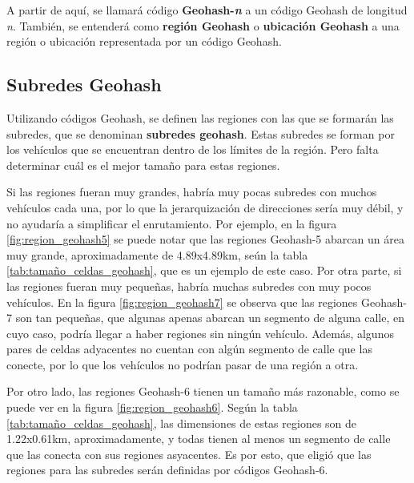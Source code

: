 A partir de aquí, se llamará código \textbf{Geohash-\textit{n}} a un código
Geohash de longitud \textit{n}. También, se entenderá como \textbf{región
Geohash} o \textbf{ubicación Geohash} a una región o ubicación representada por
un código Geohash.

\subsection{Subredes Geohash}
\label{subsec:subredes_geohash}

Utilizando códigos Geohash, se definen las regiones con las que se formarán las
subredes, que se denominan \textbf{subredes geohash}. Estas subredes se forman
por los vehículos que se encuentran dentro de los límites de la región. Pero
falta determinar cuál es el mejor tamaño para estas regiones.

Si las regiones fueran muy grandes, habría muy pocas subredes con muchos
vehículos cada una, por lo que la jerarquización de direcciones sería muy débil,
y no ayudaría a simplificar el enrutamiento. Por ejemplo, en la figura
\ref{fig:region_geohash5} se puede notar que las regiones Geohash-5 abarcan un
área muy grande, aproximadamente de 4.89x4.89km, seún la tabla
\ref{tab:tamaño_celdas_geohash}, que es un ejemplo de este caso. Por otra parte,
si las regiones fueran muy pequeñas, habría muchas subredes con muy pocos
vehículos. En la figura \ref{fig:region_geohash7} se observa que las regiones
Geohash-7 son tan pequeñas, que algunas apenas abarcan un segmento de alguna
calle, en cuyo caso, podría llegar a haber regiones sin ningún vehículo. Además,
algunos pares de celdas adyacentes no cuentan con algún segmento de calle que
las conecte, por lo que los vehículos no podrían pasar de una región a otra.

Por otro lado, las regiones Geohash-6 tienen un tamaño más razonable, como se
puede ver en la figura \ref{fig:region_geohash6}. Según la tabla
\ref{tab:tamaño_celdas_geohash}, las dimensiones de estas regiones son de
1.22x0.61km, aproximadamente, y todas tienen al menos un segmento de calle que
las conecta con sus regiones asyacentes. Es por esto, que eligió que las
regiones para las subredes serán definidas por códigos Geohash-6.

